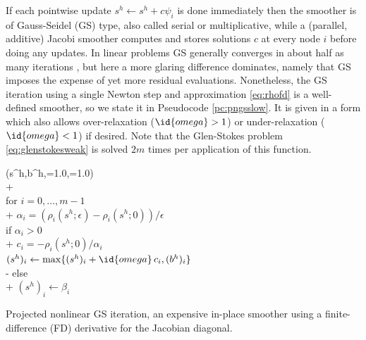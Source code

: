 \documentclass[letterpaper,final,12pt,reqno]{amsart}
\theoremstyle{claim}
\newcommand{\eps}{\epsilon}
\numberwithin{equation}{section}
\numberwithin{figure}{section}
\numberwithin{table}{section}
\numberwithin{theorem}{section}
\begin{document}
If each pointwise update $s^h \gets s^h + c \psi_i$ is done immediately then the smoother is of Gauss-Seidel (GS) type, also called serial or multiplicative, while a (parallel, additive) Jacobi smoother computes and stores solutions $c$ at every node $i$ before doing any updates.  In linear problems GS generally converges in about half as many iterations \cite{Greenbaum1997}, but here a more glaring difference dominates, namely that GS imposes the expense of yet more residual evaluations.  Nonetheless, the GS iteration using a single Newton step and approximation \eqref{eq:rhofd} is a well-defined smoother, so we state it in Pseudocode \ref{pc:pngsslow}.  It is given in a form which also allows over-relaxation ($\id{omega} > 1$) or under-relaxation ($\id{omega} < 1$) if desired.  Note that the Glen-Stokes problem \eqref{eq:glenstokesweak} is solved $2m$ times per application of this function.

\begin{pcode}[ht]
\begin{pseudo*}
(s^h,b^h,=1.0,=1.0)\text{:} \\+
     \\
    for $i = 0,\dots,m-1$ \\+
        $\alpha_i = (\rho_i(s^h; \eps) - \rho_i(s^h; 0))/\eps$  \qquad\qquad {} \\
        if $\alpha_i > 0$ \\+
            $c_i = - \rho_i(s^h; 0) / \alpha_i$ \\
            $(s^h)_i \gets \max\{(s^h)_i + \id{omega}\,c_i, (b^h)_i\}$ \\-
        else \\+
            $(s^h)_i \gets \beta_i$ \qquad\qquad {}
\end{pseudo*}
\caption{Projected nonlinear GS iteration, an expensive in-place smoother using a finite-difference (FD) derivative for the Jacobian diagonal.}
\label{pc:pngsslow}
\end{pcode}
\end{document}
